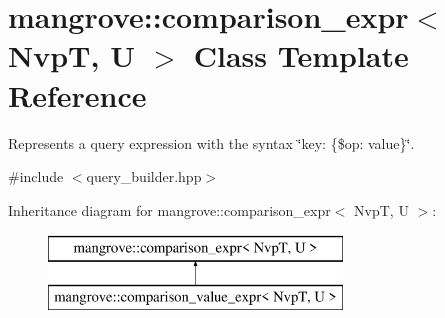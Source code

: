 \hypertarget{classmangrove_1_1comparison__expr}{}\section{mangrove\+:\+:comparison\+\_\+expr$<$ NvpT, U $>$ Class Template Reference}
\label{classmangrove_1_1comparison__expr}


Represents a query expression with the syntax \char`\"{}key\+: \{\$op\+: value\}\char`\"{}.  




{\ttfamily \#include $<$query\+\_\+builder.\+hpp$>$}

Inheritance diagram for mangrove\+:\+:comparison\+\_\+expr$<$ NvpT, U $>$\+:\begin{figure}[H]
\begin{center}
\leavevmode
\includegraphics[height=2.000000cm]{classmangrove_1_1comparison__expr}
\end{center}
\end{figure}
